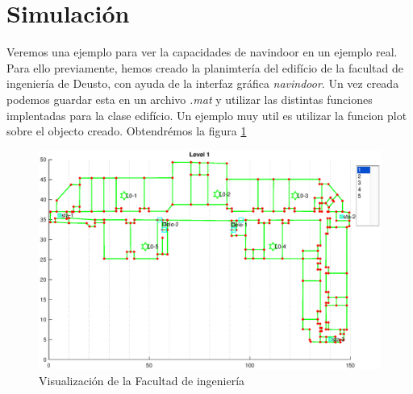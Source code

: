 \section{Simulación}

Veremos una ejemplo para ver la capacidades de navindoor en un ejemplo real. Para ello previamente, hemos creado la planimtería del edifício de la facultad de ingeniería de Deusto, con ayuda de la interfaz gráfica \emph{navindoor}. Un vez creada podemos guardar esta en un archivo \emph{.mat} y utilizar las distintas funciones implentadas para la clase edifício. Un ejemplo muy util es utilizar la funcion plot sobre el objecto creado. Obtendrémos la figura \ref{UD_build}  
\begin{figure}\label{UD_build}
    \includegraphics[width=1.0\columnwidth]{img/example/UD_build.eps}
    \caption[]{Visualización de la Facultad de ingeniería}
\end{figure}


